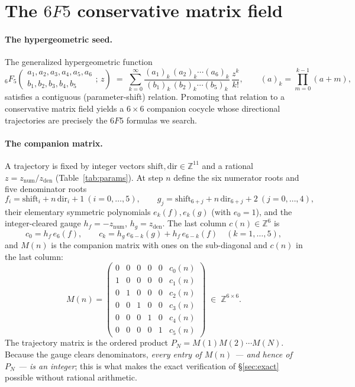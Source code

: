 \documentclass[11pt,a4paper]{article}
\theoremstyle{definition}
\newcommand{\Z}{\mathbb{Z}}
\begin{document}
\section{The $6F5$ conservative matrix field}
\label{sec:6f5}

\paragraph{The hypergeometric seed.} The generalized hypergeometric function
\[
  {}_6F_5\!\left(\begin{matrix} a_1,a_2,a_3,a_4,a_5,a_6\\ b_1,b_2,b_3,b_4,b_5\end{matrix};\,z\right)
  \;=\; \sum_{k=0}^{\infty}
    \frac{(a_1)_k\,(a_2)_k\cdots(a_6)_k}{(b_1)_k\,(b_2)_k\cdots(b_5)_k}\,\frac{z^{k}}{k!},
  \qquad (a)_k=\textstyle\prod_{m=0}^{k-1}(a+m),
\]
satisfies a contiguous (parameter-shift) relation. Promoting that relation to a conservative
matrix field yields a $6\times6$ companion cocycle whose directional trajectories are precisely
the $6F5$ formulas we search.

\paragraph{The companion matrix.} A trajectory is fixed by integer vectors
$\mathrm{shift},\mathrm{dir}\in\Z^{11}$ and a rational $z=z_{\mathrm{num}}/z_{\mathrm{den}}$
(Table~\ref{tab:params}). At step $n$ define the six numerator roots and five denominator roots
\[
  f_i = \mathrm{shift}_i + n\,\mathrm{dir}_i + 1 \ (i=0,\dots,5),\qquad
  g_j = \mathrm{shift}_{6+j} + n\,\mathrm{dir}_{6+j} + 2 \ (j=0,\dots,4),
\]
their elementary symmetric polynomials $e_k(f),e_k(g)$ (with $e_0=1$), and the
integer-cleared gauge $h_f=-z_{\mathrm{num}}$, $h_g=z_{\mathrm{den}}$. The last column
$c(n)\in\Z^{6}$ is
\[
  c_0 = h_f\,e_6(f), \qquad
  c_k = h_g\,e_{6-k}(g) + h_f\,e_{6-k}(f)\quad(k=1,\dots,5),
\]
and $M(n)$ is the companion matrix with ones on the sub-diagonal and $c(n)$ in the last column:
\[
  M(n)=
  \begin{pmatrix}
    0 & 0 & 0 & 0 & 0 & c_0(n)\\
    1 & 0 & 0 & 0 & 0 & c_1(n)\\
    0 & 1 & 0 & 0 & 0 & c_2(n)\\
    0 & 0 & 1 & 0 & 0 & c_3(n)\\
    0 & 0 & 0 & 1 & 0 & c_4(n)\\
    0 & 0 & 0 & 0 & 1 & c_5(n)
  \end{pmatrix}\;\in\;\Z^{6\times6}.
\]
The trajectory matrix is the ordered product $P_N = M(1)M(2)\cdots M(N)$. Because the gauge
clears denominators, \emph{every entry of $M(n)$ --- and hence of $P_N$ --- is an integer}; this
is what makes the exact verification of \S\ref{sec:exact} possible without rational arithmetic.
\end{document}
